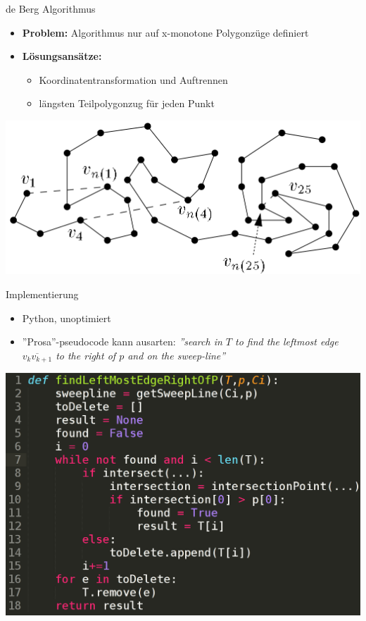 \documentclass[14pt]{beamer}
\begin{document}
\begin{frame}{de Berg Algorithmus}
  \begin{itemize}
  	\item \textbf{Problem:} Algorithmus nur auf x-monotone Polygonzüge definiert
	\item \textbf{Lösungsansätze:}
		\begin{itemize}
			\item Koordinatentransformation und Auftrennen
			\item längsten Teilpolygonzug für jeden Punkt
		\end{itemize}
  \end{itemize}
\includegraphics[width=1.0\textwidth]{img/determineSubchain.png}  
\end{frame}

\begin{frame}{Implementierung}
\begin{itemize}
	\item Python, unoptimiert
	\item ''Prosa''-pseudocode kann ausarten: \emph{''search in $T$ to find the leftmost edge $\overline{v_kv_{k+1}}$ to the right of $p$ and on the
sweep-line''}
\end{itemize}

\includegraphics[width=.8\textwidth,center]{img/implvspseudo.png}
\end{frame}
\end{document}
